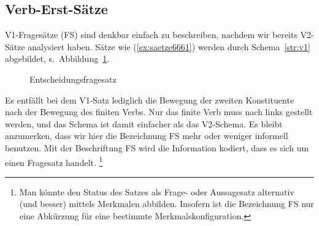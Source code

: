 \subsection{Verb-Erst-Sätze}

\label{sec:verberstsatz}


\begin{sloppypar}
V1-Fragesätze (FS) sind denkbar einfach zu beschreiben, nachdem wir bereits V2-Sätze analysiert haben.
Sätze wie (\ref{ex:saetze6661}) werden durch Schema~\ref{str:v1} abgebildet, s.\ Abbildung~\ref{fig:v1satz}.
\end{sloppypar}


\begin{exe}
\end{exe}

\begin{figure}[!htbp]
  \centering
  \vspace{0.3cm}
  \caption{Entscheidungsfragesatz}
  \label{fig:v1satz}
\end{figure}

Es entfällt bei dem V1-Satz lediglich die Bewegung der zweiten Konstituente nach der Bewegung des finiten Verbs.
Nur das finite Verb muss nach links gestellt werden, und das Schema ist damit einfacher als das V2-Schema.
Es bleibt anzumerken, dass wir hier die Bezeichnung FS mehr oder weniger informell benutzen.
Mit der Beschriftung FS wird die Information kodiert, dass es sich um einen Fragesatz handelt.%
\footnote{Man könnte den Status des Satzes als Frage- oder Aussagesatz alternativ (und besser) mittels Merkmalen abbilden.
Insofern ist die Bezeichnung FS nur eine Abkürzung für eine bestimmte Merkmalskonfiguration.}

